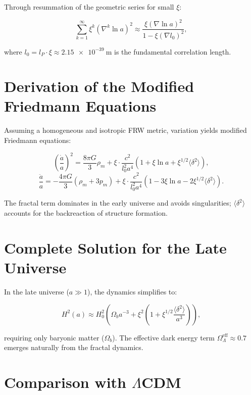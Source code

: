 	Through resummation of the geometric series for small $\xi$:
	
	\begin{equation}
		\sum_{k=1}^\infty \xi^k (\nabla^k \ln a)^2 \approx \frac{\xi (\nabla \ln a)^2}{1 - \xi (\nabla l_0)^2},
	\end{equation}
	
	where $l_0 = l_P \cdot \xi \approx \SI{2.15e-39}{\meter}$ is the fundamental correlation length.
	
	\section*{Derivation of the Modified Friedmann Equations}
	
	Assuming a homogeneous and isotropic FRW metric, variation yields modified Friedmann equations:
	
	\begin{equation}
		\left( \frac{\dot{a}}{a} \right)^2 = \frac{8\pi G}{3} \rho_m + \xi \cdot \frac{c^2}{l_0^2 a^4} \left( 1 + \xi \ln a + \xi^{1/2} \langle \delta^2 \rangle \right),
	\end{equation}
	\begin{equation}
		\frac{\ddot{a}}{a} = -\frac{4\pi G}{3} (\rho_m + 3p_m) + \xi \cdot \frac{c^2}{l_0^2 a^4} \left( 1 - 3\xi \ln a - 2\xi^{1/2} \langle \delta^2 \rangle \right).
	\end{equation}
	
	The fractal term dominates in the early universe and avoids singularities; $\langle \delta^2 \rangle$ accounts for the backreaction of structure formation.
	
	\section*{Complete Solution for the Late Universe}
	
	In the late universe ($a \gg 1$), the dynamics simplifies to:
	
	\begin{equation}
		H^2(a) \approx H_0^2 \left( \Omega_b a^{-3} + \xi^2 \left(1 + \xi^{1/2} \frac{\langle \delta^2 \rangle}{a^3} \right) \right),
	\end{equation}
	
	requiring only baryonic matter ($\Omega_b$). The effective dark energy term $\Omega_\Lambda^{\text{eff}} \approx 0.7$ emerges naturally from the fractal dynamics.
	
	\section*{Comparison with $\Lambda$CDM}
	
